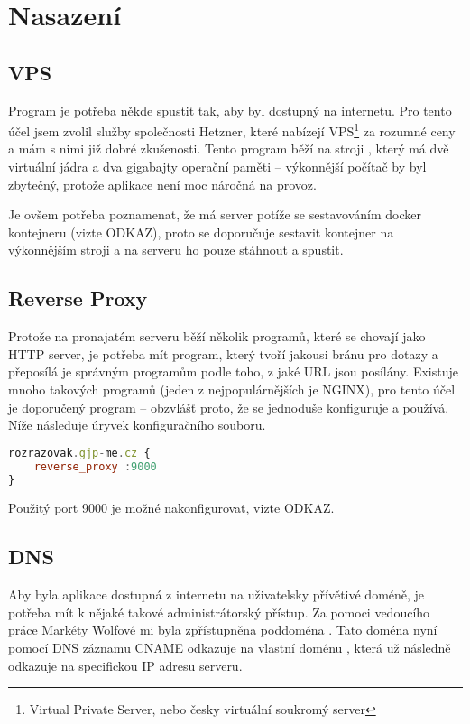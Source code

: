 \hypertarget{Technologie}{\chapter{Nasazení}}

\section{VPS}

Program je potřeba někde spustit tak, aby byl dostupný na internetu. Pro tento účel jsem zvolil služby společnosti Hetzner, které nabízejí VPS\footnote{Virtual Private Server, nebo česky virtuální soukromý server} za rozumné ceny a mám s nimi již dobré zkušenosti. Tento program běží na stroji , který má dvě virtuální jádra a dva gigabajty operační paměti -- výkonnější počítač by byl zbytečný, protože aplikace není moc náročná na provoz.

Je ovšem potřeba poznamenat, že má server potíže se sestavováním docker kontejneru (vizte ODKAZ), proto se doporučuje sestavit kontejner na výkonnějším stroji a na serveru ho pouze stáhnout a spustit. 

\section{Reverse Proxy}

Protože na pronajatém serveru běží několik programů, které se chovají jako HTTP server, je potřeba mít program, který tvoří jakousi bránu pro dotazy a přeposílá je správným programům podle toho, z jaké URL jsou posílány. Existuje mnoho takových programů (jeden z nejpopulárnějších je NGINX), pro tento účel je doporučený program  -- obzvlášť proto, že se jednoduše konfiguruje a používá. Níže následuje úryvek konfiguračního souboru. 

\begin{lstlisting}[language=JavaScript,caption={Úryvek konfiguračního souboru Caddy}]
rozrazovak.gjp-me.cz {
    reverse_proxy :9000
}
\end{lstlisting}

Použitý port 9000 je možné nakonfigurovat, vizte ODKAZ.

\section{DNS}

Aby byla aplikace dostupná z internetu na uživatelsky přívětivé doméně, je potřeba mít k nějaké takové administrátorský přístup. Za pomoci vedoucího práce Markéty Wolfové mi byla zpřístupněna poddoména . Tato doména nyní pomocí DNS záznamu CNAME odkazuje na vlastní doménu , která už následně odkazuje na specifickou IP adresu serveru. 

